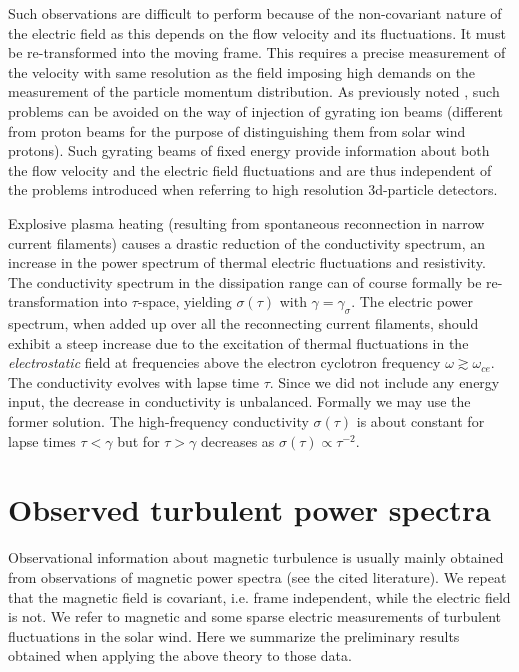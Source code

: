\documentclass[ ]{copernicus2}
\begin{document}
{{{{Such observations are difficult to perform because of the non-covariant nature of the electric field as this depends on the flow velocity and its fluctuations.  It must be re-transformed into the moving frame. This requires a precise measurement of the velocity with same resolution as the field imposing high demands on the measurement of the particle momentum distribution. As previously noted  \citep{treumann2016}, such problems can be avoided on the way of injection of gyrating ion beams (different from proton beams for the purpose of distinguishing them from solar wind protons). Such gyrating beams of fixed energy provide information about both the flow velocity and the electric field fluctuations and are thus independent of the problems introduced when referring to high resolution 3d-particle detectors. }

Explosive plasma heating (resulting from spontaneous reconnection in narrow current filaments) causes a drastic reduction of the conductivity spectrum, an increase in the power spectrum of thermal electric fluctuations and resistivity. {The conductivity spectrum in the dissipation range can of course formally be re-transformation} into $\tau$-space, yielding $\sigma(\tau)$ with $\gamma=\gamma_\sigma$. The electric power spectrum, when added up over all the reconnecting current filaments, should exhibit a steep increase  due to the excitation of thermal fluctuations in the \emph{electrostatic} field {at frequencies above} the electron cyclotron frequency $\omega\gtrsim\omega_{ce}$. The conductivity evolves with lapse time $\tau$. Since we did not include any energy input, the decrease in conductivity is unbalanced. Formally we may use the former solution. The high-frequency conductivity $\sigma(\tau)$ is about constant for lapse times $\tau<\gamma$ but for $\tau>\gamma$ decreases as $\sigma(\tau)\propto \tau^{-2}$.

\section{Observed turbulent power spectra}
{Observational information about magnetic turbulence is usually mainly obtained from observations of magnetic power spectra (see the cited literature).} We repeat that the magnetic field is covariant, i.e. frame independent, while the electric field is not. We refer to magnetic and some sparse electric measurements of turbulent fluctuations in the solar wind. {Here we summarize the preliminary results obtained \citep{treumann2017} when applying the above theory to those data.}

}}}
\end{document}
